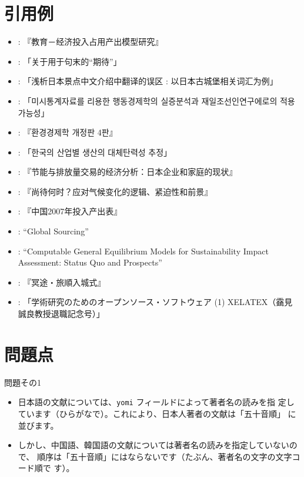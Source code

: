 \documentclass[article]{jlreq}
\begin{document}
\section{引用例}
\begin{itemize}
 \item \citet{zhang_IO_2009}: 『教育－经济投入占用产出模型研究』
 \item \citet{40022221997}: 「关于用于句末的``期待''」
 \item \citet{40022198771}: 「浅析日本景点中文介绍中翻译的误区 : 以日本古城堡相关词汇为例」
 \item \citet{40022308104}: 「미시통계자료를 리용한 행동경제학의 실증분석과 재일조선인연구에로의 적용가능성」
 \item \citet{gwon-osang-env-econ-2020}: 『환경경제학 개정판 4판』
 \item \citet{Seong-Tae_Kim_2011}: 「한국의 산업별 생산의 대체탄력성 추정」
 \item \citet{arimura-takeda-energy-2017}: 『节能与排放量交易的经济分析：日本企业和家庭的现状』
 \item \citet{Stern_2016:chn}: 『尚待何时？应对气候变化的逻辑、紧迫性和前景』
 \item \citet{china-io-2007}: 『中国2007年投入产出表』
 \item \citet{Stokey2004}: ``Global Sourcing''
 \item \citet{Bohringer2006}: ``Computable General Equilibrium Models for
       Sustainability Impact Assessment: Status Quo and Prospects''
 \item \citet{内田90}: 『冥途・旅順入城式』
 \item \citet{120005614155}: 「学術研究のためのオープンソース・ソフトウェア (1)
       XELATEX（靎見誠良教授退職記念号）」
\end{itemize}

\section{問題点}

問題その1
\begin{itemize}
 \item 日本語の文献については、\texttt{yomi} フィールドによって著者名の読みを指
       定しています（ひらがなで）。これにより、日本人著者の文献は「五十音順」
       に並びます。
 \item しかし、中国語、韓国語の文献については著者名の読みを指定していないので、
       順序は「五十音順」にはならないです（たぶん、著者名の文字の文字コード順で
       す）。
\end{itemize}
\end{document}
